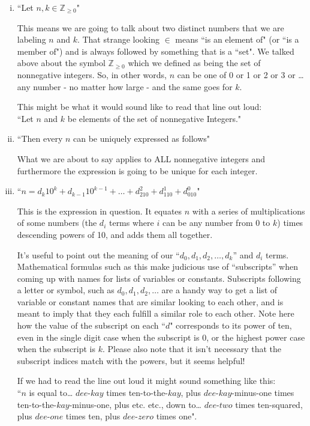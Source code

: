 \documentclass{article}
\begin{document}
\begin{enumerate}[i)]
\item ``Let $n,k\in \mathbb{Z}_{\ge 0}$"

This means we are going to talk about two distinct numbers
that we are labeling $n$ and $k$.
That strange looking $\in$ means ``is an element of" (or ``is a member of")
and is always followed by something that is a ``set".
We talked above about the symbol $\mathbb{Z}_{\ge 0}$ which
we defined as being the set of nonnegative integers.
So, in other words, $n$ can be one of 0 or 1 or 2 or 3 or \dots{} 
any number - no matter how large - and the same goes for $k$.

This might be what it would sound like to read that line out loud:\\
``Let $n$ and $k$ be elements of the set of nonnegative Integers."

\item ``Then every $n$ can be uniquely expressed as follows"

What we are about to say applies to ALL nonnegative integers
and furthermore the expression is going to be unique for each integer.

\item ``$n=d_k10^k+d_{k-1}10^{k-1}+\dots+d_210^2+d_110^1+d_010^0$"

This is the expression in question. It equates $n$ with a series of multiplications
of some numbers (the $d_i$ terms where $i$ can be any
number from 0 to $k$) times descending powers of 10,
and adds them all together.

It's useful to point out the meaning of our ``$d_0,d_1,d_2,\dots{},d_k$'' and $d_i$ terms.
Mathematical formulas such as this make judicious use of ``subscripts''
when coming up with names for lists of variables or constants.
Subscripts following a letter or symbol, such as $d_0,d_1,d_2,\dots{}$
are a handy way to get a list of variable or constant names that are similar looking to each other,
and is meant to imply that they each fulfill a similar role to each other.
Note here how the value of the subscript on each ``$d$" corresponds to its power of ten,
even in the single digit case when the subscript is 0,
or the highest power case when the subscript is $k$. Please also note that it
isn't necessary that the subscript indices match with the powers, but it seems helpful! 

If we had to read the line out loud it might sound something like this:\\
``$n$ is equal to\dots{} $dee$-$kay$ times ten-to-the-$kay$,
plus $dee$-$kay$-minus-one times ten-to-the-$kay$-minus-one,
plus etc. etc., down to\dots{} $dee$-$two$ times ten-squared,
plus $dee$-$one$ times ten, plus $dee$-$zero$ times one".


\end{enumerate}
\end{document}
